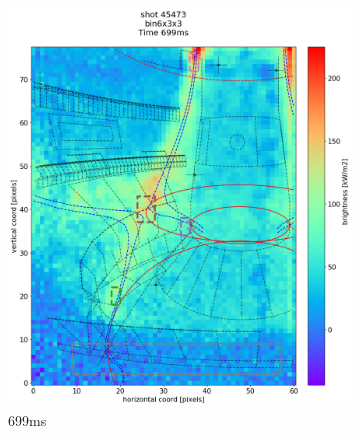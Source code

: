 \begin{figure}
\begin{subfigure}{0.355\linewidth}
         \includegraphics[trim={50 45 25 80},clip,width=\textwidth]{Chapters/chapter2/figs/IRVB-MASTU_shot-45473_export_37.png}
         \vspace*{-6.5mm}
         \caption{699ms}
         \label{fig:45473_export_4}
     \end{subfigure}
     \begin{subfigure}{0.4\linewidth}
         \centering

\end{subfigure}
\end{figure}
